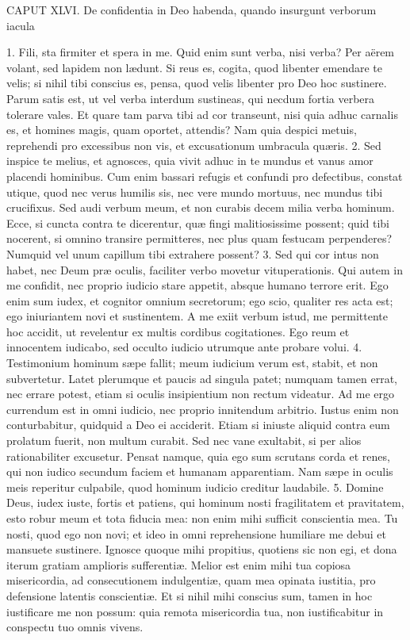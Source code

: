 CAPUT XLVI.
De confidentia in Deo habenda, quando insurgunt verborum iacula

1. Fili, sta firmiter et spera in me. Quid enim sunt verba, nisi verba? Per aërem volant, sed lapidem non lædunt. Si reus es, cogita, quod libenter emendare te velis; si nihil tibi conscius es, pensa, quod velis libenter pro Deo hoc sustinere. Parum satis est, ut vel verba interdum sustineas, qui necdum fortia verbera tolerare vales. Et quare tam parva tibi ad cor transeunt, nisi quia adhuc carnalis es, et homines magis, quam oportet, attendis? Nam quia despici metuis, reprehendi pro excessibus non vis, et excusationum umbracula quæris.
2. Sed inspice te melius, et agnosces, quia vivit adhuc in te mundus et vanus amor placendi hominibus. Cum enim bassari refugis et confundi pro defectibus, constat utique, quod nec verus humilis sis, nec vere mundo mortuus, nec mundus tibi crucifixus. Sed audi verbum meum, et non curabis decem milia verba hominum. Ecce, si cuncta contra te dicerentur, quæ fingi malitiosissime possent; quid tibi nocerent, si omnino transire permitteres, nec plus quam festucam perpenderes? Numquid vel unum capillum tibi extrahere possent?
3. Sed qui cor intus non habet, nec Deum præ oculis, faciliter verbo movetur vituperationis. Qui autem in me confidit, nec proprio iudicio stare appetit, absque humano terrore erit. Ego enim sum iudex, et cognitor omnium secretorum; ego scio, qualiter res acta est; ego iniuriantem novi et sustinentem. A me exiit verbum istud, me permittente hoc accidit, ut revelentur ex multis cordibus cogitationes. Ego reum et innocentem iudicabo, sed occulto iudicio utrumque ante probare volui.
4. Testimonium hominum sæpe fallit; meum iudicium verum est, stabit, et non subvertetur. Latet plerumque et paucis ad singula patet; numquam tamen errat, nec errare potest, etiam si oculis insipientium non rectum videatur. Ad me ergo currendum est in omni iudicio, nec proprio innitendum arbitrio. Iustus enim non conturbabitur, quidquid a Deo ei acciderit. Etiam si iniuste aliquid contra eum prolatum fuerit, non multum curabit. Sed nec vane exultabit, si per alios rationabiliter excusetur. Pensat namque, quia ego sum scrutans corda et renes, qui non iudico secundum faciem et humanam apparentiam. Nam sæpe in oculis meis reperitur culpabile, quod hominum iudicio creditur laudabile.
5. Domine Deus, iudex iuste, fortis et patiens, qui hominum nosti fragilitatem et pravitatem, esto robur meum et tota fiducia mea: non enim mihi sufficit conscientia mea. Tu nosti, quod ego non novi; et ideo in omni reprehensione humiliare me debui et mansuete sustinere. Ignosce quoque mihi propitius, quotiens sic non egi, et dona iterum gratiam amplioris sufferentiæ. Melior est enim mihi tua copiosa misericordia, ad consecutionem indulgentiæ, quam mea opinata iustitia, pro defensione latentis conscientiæ. Et si nihil mihi conscius sum, tamen in hoc iustificare me non possum: quia remota misericordia tua, non iustificabitur in conspectu tuo omnis vivens.


